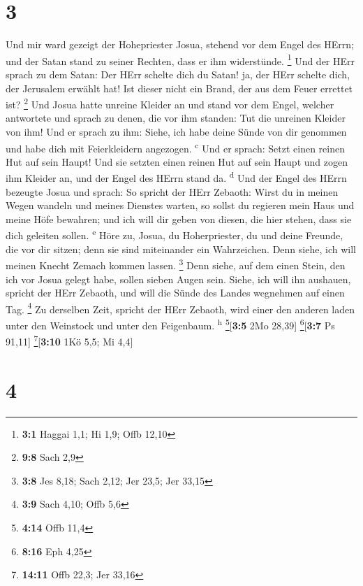 \hypertarget{section-2}{%
\section{3}\label{section-2}}

 Und mir ward gezeigt der Hohepriester Josua, stehend vor
dem Engel des HErrn; und der Satan stand zu seiner Rechten, dass er ihm
widerstünde. \footnote{\textbf{3:1} Haggai 1,1; Hi 1,9; Offb 12,10}
 Und der HErr sprach zu dem Satan: Der HErr schelte dich
du Satan! ja, der HErr schelte dich, der Jerusalem erwählt hat! Ist
dieser nicht ein Brand, der aus dem Feuer errettet ist? \footnote{\textbf{9:8}
  Sach 2,9}  Und Josua hatte unreine Kleider an und stand
vor dem Engel,  welcher antwortete und sprach zu denen,
die vor ihm standen: Tut die unreinen Kleider von ihm! Und er sprach zu
ihm: Siehe, ich habe deine Sünde von dir genommen und habe dich mit
Feierkleidern angezogen. \textsuperscript{c}  Und er
sprach: Setzt einen reinen Hut auf sein Haupt! Und sie setzten einen
reinen Hut auf sein Haupt und zogen ihm Kleider an, und der Engel des
HErrn stand da. \textsuperscript{d}  Und der Engel des
HErrn bezeugte Josua und sprach:  So spricht der HErr
Zebaoth: Wirst du in meinen Wegen wandeln und meines Dienstes warten, so
sollst du regieren mein Haus und meine Höfe bewahren; und ich will dir
geben von diesen, die hier stehen, dass sie dich geleiten sollen.
\textsuperscript{e}  Höre zu, Josua, du Hoherpriester, du
und deine Freunde, die vor dir sitzen; denn sie sind miteinander ein
Wahrzeichen. Denn siehe, ich will meinen Knecht Zemach kommen lassen.
\footnote{\textbf{3:8} Jes 8,18; Sach 2,12; Jer 23,5; Jer 33,15}
 Denn siehe, auf dem einen Stein, den ich vor Josua gelegt
habe, sollen sieben Augen sein. Siehe, ich will ihn aushauen, spricht
der HErr Zebaoth, und will die Sünde des Landes wegnehmen auf einen Tag.
\footnote{\textbf{3:9} Sach 4,10; Offb 5,6}  Zu derselben
Zeit, spricht der HErr Zebaoth, wird einer den anderen laden unter den
Weinstock und unter den Feigenbaum. \textsuperscript{h}
\footnote{\textbf{4:14} Offb 11,4}{[}\textbf{3:5} 2Mo 28,39{]}
\footnote{\textbf{8:16} Eph 4,25}{[}\textbf{3:7} Ps 91,11{]}
\footnote{\textbf{14:11} Offb 22,3; Jer 33,16}{[}\textbf{3:10} 1Kö 5,5;
Mi 4,4{]}

\hypertarget{section-3}{%
\section{4}\label{section-3}}

